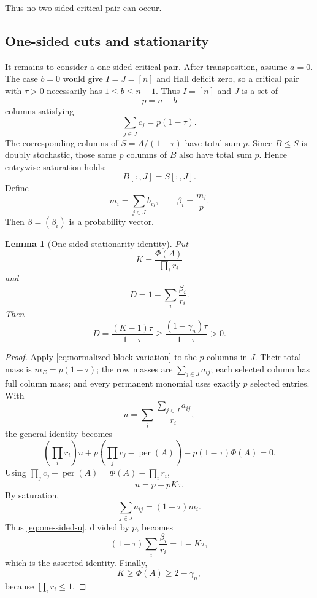 \documentclass[11pt,a4paper]{article}
\numberwithin{equation}{section}
\newtheorem{lemma}[theorem]{Lemma}
\theoremstyle{definition}
\newcommand{\per}{\operatorname{per}}
\newcommand{\1}{\mathbf{1}}
\begin{document}
Thus no two-sided critical pair can occur.

\subsection{One-sided cuts and stationarity}

It remains to consider a one-sided critical pair.  After transposition,
assume $a=0$.  The case $b=0$ would give $I=J=[n]$ and Hall deficit zero,
so a critical pair with $\tau>0$ necessarily has
$1\le b\le n-1$.  Thus $I=[n]$ and $J$ is a set of
\[
 p=n-b
\]
columns satisfying
\begin{equation}\label{eq:one-sided-mass}
 \sum_{j\in J}c_j=p(1-\tau).
\end{equation}
The corresponding columns of $S=A/(1-\tau)$ have total sum $p$.  Since $B\le S$ is doubly stochastic, those same $p$ columns of $B$ also have total sum $p$.  Hence entrywise saturation holds:
\begin{equation}\label{eq:saturation}
 B[:,J]=S[:,J].
\end{equation}
Define
\begin{equation}\label{eq:beta}
 m_i=\sum_{j\in J}b_{ij},
 \qquad
 \beta_i=\frac{m_i}{p}.
\end{equation}
Then $\beta=(\beta_i)$ is a probability vector.

\begin{lemma}[One-sided stationarity identity]\label{lem:one-sided-stationarity}
Put
\[
 K=\frac{\Phi(A)}{\prod_i r_i}
\]
and
\[
 D=1-\sum_i\frac{\beta_i}{r_i}.
\]
Then
\begin{equation}\label{eq:D-lower}
 D=\frac{(K-1)\tau}{1-\tau}
 \ge\frac{(1-\gamma_n)\tau}{1-\tau}>0.
\end{equation}
\end{lemma}

\begin{proof}
Apply \eqref{eq:normalized-block-variation} to the $p$ columns in $J$.
Their total mass is $m_E=p(1-\tau)$; the row masses are
$\sum_{j\in J}a_{ij}$; each selected column has full column mass; and every
permanent monomial uses exactly $p$ selected entries.  With
\[
 u=\sum_i\frac{\sum_{j\in J}a_{ij}}{r_i},
\]
the general identity becomes
\[
 \left(\prod_i r_i\right)u
 +p\left(\prod_jc_j-\per(A)\right)
 -p(1-\tau)\Phi(A)=0.
\]
Using $\prod_jc_j-\per(A)=\Phi(A)-\prod_i r_i$,
\begin{equation}\label{eq:one-sided-u}
 u=p-pK\tau.
\end{equation}
By saturation,
\[
 \sum_{j\in J}a_{ij}=(1-\tau)m_i.
\]
Thus \eqref{eq:one-sided-u}, divided by $p$, becomes
\[
 (1-\tau)\sum_i\frac{\beta_i}{r_i}=1-K\tau,
\]
which is the asserted identity.  Finally,
\[
 K\ge\Phi(A)\ge2-\gamma_n,
\]
because $\prod_i r_i\le1$.
\end{proof}
\end{document}
